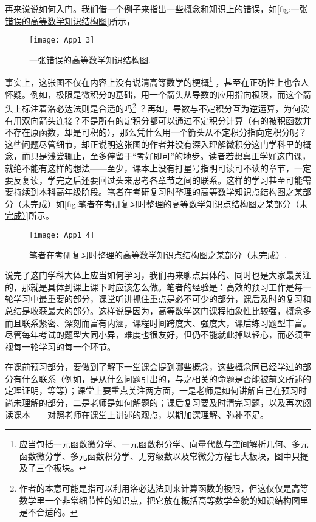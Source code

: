   \hspace*{2em}再来说说如何入门。我们借一个例子来指出一些概念和知识上的错误，如\autoref{fig:一张错误的高等数学知识结构图}所示，
  \begin{figure}[!htb]
    \centering
    \texttt{[image: App1\_3]}
    \caption{一张错误的高等数学知识结构图.}\label{fig:一张错误的高等数学知识结构图}
  \end{figure}
  事实上，这张图不仅在内容上没有说清高等数学的梗概\footnote{应当包括一元函数微分学、一元函数积分学、向量代数与空间解析几何、多元函数微分学、多元函数积分学、无穷级数以及常微分方程七大板块，图中只提及了三个板块。}
  ，甚至在正确性上也令人怀疑。例如，极限是微积分的基础，用一个箭头从导数的应用指向极限，而这个箭头上标注着洛必达法则是合适的吗\footnote{作者的本意可能是指可以利用洛必达法则来计算函数的极限，但这仅仅是高等数学里一个非常细节性的知识点，把它放在概括高等数学全貌的知识结构图里是不合适的。}
  ？再如，导数与不定积分互为逆运算，为何没有用双向箭头连接？不是所有的定积分都可以通过不定积分计算（有的被积函数并不存在原函数，却是可积的），那么凭什么用一个箭头从不定积分指向定积分呢？这些问题尽管细节，却正说明这张图的作者并没有深入理解微积分这门学科里的概念，而只是浅尝辄止，至多停留于“考好即可”的地步。读者若想真正学好这门课，就绝不能有这样的想法——至少，课本上没有打星号指明可读可不读的章节，一定要反复读，学完之后还要回过头来思考各章节之间的联系。这样的学习甚至可能需要持续到本科高年级阶段。笔者在考研复习时整理的高等数学知识点结构图之某部分（未完成）如\autoref{fig:笔者在考研复习时整理的高等数学知识点结构图之某部分（未完成）}所示。
  \begin{figure}[!htb]
    \centering
    \texttt{[image: App1\_4]}
    \caption{笔者在考研复习时整理的高等数学知识点结构图之某部分（未完成）.}\label{fig:笔者在考研复习时整理的高等数学知识点结构图之某部分（未完成）}
  \end{figure}

  \hspace*{2em}说完了这门学科大体上应当如何学习，我们再来聊点具体的、同时也是大家最关注的，那就是具体到课上课下时应该怎么做。笔者的经验是：高效的预习工作是每一轮学习中最重要的部分，课堂听讲抓住重点是必不可少的部分，课后及时的复习和总结是收获最大的部分。这样说是因为，高等数学这门课程抽象性比较强，概念多而且联系紧密、深刻而富有内涵，课程时间跨度大、强度大，课后练习题型丰富。尽管每年考试的题型大同小异，难度也很友好，但仍不能就此掉以轻心，而必须重视每一轮学习的每一个环节。

  \hspace*{2em}在课前预习部分，要做到了解下一堂课会提到哪些概念，这些概念同已经学过的部分有什么联系（例如，是从什么问题引出的，与之相关的命题是否能被前文所述的定理证明，等等）；课堂上要重点关注两方面，一是老师是如何讲解自己在预习时尚未理解的部分，二是老师是如何解题的；课后复习要及时清完习题，以及再次阅读课本——对照老师在课堂上讲述的观点，以期加深理解、弥补不足。

